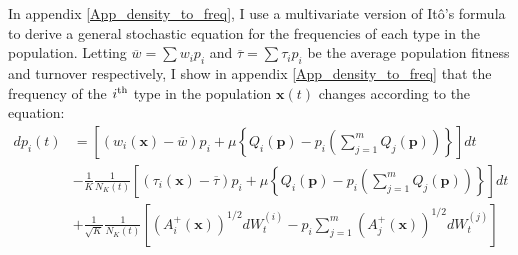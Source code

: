 In appendix \ref{App_density_to_freq}, I use a multivariate version of It\^{o}'s formula to derive a general stochastic equation for the frequencies of each type in the population. Letting $\overline{w} = \sum w_ip_i$ and $\overline{\tau} = \sum \tau_i p_i$ be the average population fitness and turnover respectively, I show in appendix \ref{App_density_to_freq} that the frequency of the $i\textsuperscript{th}$ type in the population $\mathbf{x}(t)$ changes according to the equation:
\begin{equation}
\label{nD_eqn_for_frequencies}
\begin{aligned}
dp_i(t) &= \left[(w_i(\mathbf{x}) - \overline{w})p_i + \mu\left\{Q_i(\mathbf{p}) - p_i\left(\sum\limits_{j=1}^{m}Q_j(\mathbf{p})\right)\right\}\right]dt\\
&- \frac{1}{K}\frac{1}{N_{K}(t)}\left[(\tau_i(\mathbf{x}) - \overline{\tau})p_i + \mu\left\{Q_i(\mathbf{p}) - p_i\left(\sum\limits_{j=1}^{m}Q_j(\mathbf{p})\right)\right\}\right]dt\\
&+ \frac{1}{\sqrt{K}}\frac{1}{N_{K}(t)}\left[\left(A^{+}_{i}(\mathbf{x})\right)^{1/2}dW^{(i)}_t - p_i\sum\limits_{j=1}^{m}\left(A^{+}_{j}(\mathbf{x})\right)^{1/2}dW^{(j)}_t\right]
\end{aligned}
\end{equation}
